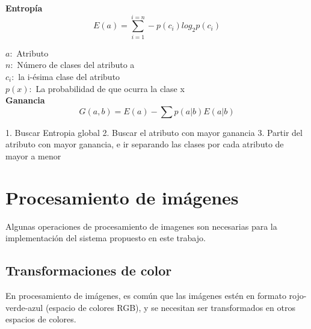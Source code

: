 \documentclass[twoside,spanish,ESP,MSc]{plantillaLabUPV}
\theoremstyle{definition}
\begin{document}
 \textbf{Entropía}\\
 
 $$E(a) = \sum_{i=1}^{i=n} -p(c_i) log_{2}p(c_i)$$
 
$a:$ Atributo\\
$n:$ Número de clases del atributo a\\
$c_i:$ la i-ésima clase del atributo \\
$p(x):$ La probabilidad de que ocurra la clase x\\
 
 \textbf{Ganancia}\\
 $$G(a,b)= E(a) - \sum p(a|b)E(a|b)$$

 1. Buscar Entropia global
 2. Buscar el atributo con mayor ganancia
 3. Partir del atributo con mayor ganancia, e ir separando las clases por cada atributo de mayor a menor



% 
% 




\section{Procesamiento de imágenes}
Algunas operaciones de procesamiento de imagenes son necesarias para la implementación del sistema propuesto en este trabajo. 


\subsection{Transformaciones de color}

En procesamiento de imágenes, es común que las imágenes estén en formato rojo-verde-azul (espacio de colores RGB), y se necesitan ser transformados en otros espacios de colores. 
\end{document}
